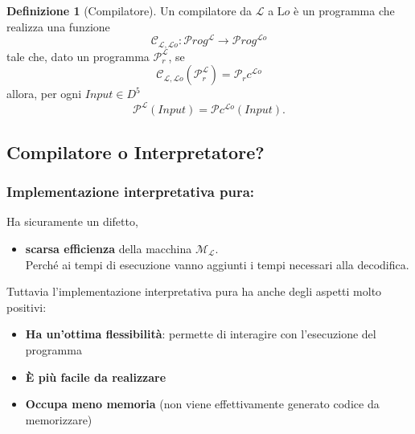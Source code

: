 \documentclass[a4paper,11pt,hidelinks]{book}
\theoremstyle{definition}
\newtheorem*{definizione}{Definizione}
\begin{document}
    \begin{definizione}[Compilatore]
        Un compilatore da $\mathcal{L}$ a $\mathrm{L}o$ è un programma che realizza una funzione
        \[ \mathcal{C}_{\mathcal{L,L}o}:\mathcal{P}rog^{\mathcal{L}} \longrightarrow \mathcal{P}rog^{\mathcal{L}o} \]
        tale che, dato un programma $\mathcal{P}_r^{\mathcal{L}}$, se
        \[ \mathcal{C}_{\mathcal{L,L}o}(\mathcal{P}_r^{\mathcal{L}})=\mathcal{P}_rc^{\mathcal{L}o} \]
        allora, per ogni $Input \in D^5$
        \[ \mathcal{P^L}(Input)=\mathcal{P}c^{\mathcal{L}o}(Input).
        \]
    \end{definizione}
    
    \newpage
    
    \subsection{Compilatore o Interpretatore?}
    \subsubsection{Implementazione interpretativa pura:}
    Ha sicuramente un difetto,
    \begin{itemize}
        \item \textbf{scarsa efficienza} della macchina $\mathcal{M_L}$. \\
        Perché ai tempi di esecuzione vanno aggiunti i tempi necessari alla decodifica.
    \end{itemize}
    Tuttavia l'implementazione interpretativa pura ha anche degli aspetti molto positivi:
    \begin{itemize}
        \item \textbf{Ha un'ottima flessibilità}: permette di interagire con l'esecuzione del programma
        \item \textbf{È più facile da realizzare}
        \item \textbf{Occupa meno memoria} (non viene effettivamente generato codice da memorizzare)
    \end{itemize}
    
\end{document}
